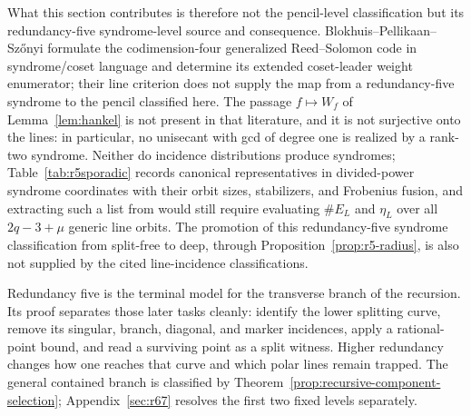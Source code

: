 \begin{remark}
What this section contributes is therefore not the pencil-level
classification but its redundancy-five syndrome-level source and
consequence.  Blokhuis--Pellikaan--Sz\H onyi formulate the
codimension-four generalized Reed--Solomon code in syndrome/coset
language and determine its extended coset-leader weight enumerator;
their line criterion does not supply the map from a redundancy-five
syndrome to the pencil classified here.  The
passage $f\mapsto W_f$ of Lemma~\ref{lem:hankel} is not present in that
literature, and it is not surjective onto the lines: in particular, no
unisecant with gcd of degree one is realized by a rank-two syndrome.  Neither do
incidence
distributions produce syndromes; Table~\ref{tab:r5sporadic} records
canonical representatives in divided-power syndrome coordinates with
their orbit sizes, stabilizers, and Frobenius fusion, and extracting
such a list from \cite[Prop.~4.5 and Thm.~5.1]{KaipaPradhan2025} would still require
evaluating $\#E_L$ and $\eta_L$ over all $2q-3+\mu$ generic line orbits.
The promotion of this redundancy-five syndrome classification from
split-free to deep, through Proposition~\ref{prop:r5-radius}, is also
not supplied by the cited line-incidence classifications.
\end{remark}

Redundancy five is the terminal model for the transverse branch of the
recursion.  Its proof separates those later tasks cleanly: identify the lower
splitting curve, remove its singular, branch, diagonal, and marker incidences,
apply a rational-point bound, and read a surviving point as a split witness.
Higher redundancy changes how one reaches that curve and which polar lines
remain trapped.  The general contained branch is classified by
Theorem~\ref{prop:recursive-component-selection}; Appendix~\ref{sec:r67}
resolves the first two fixed levels separately.

